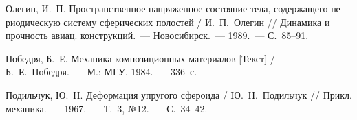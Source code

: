\begin{russian}
\begin{biblist}{99}







Олегин, И.~П. 
Пространственное напряженное состояние тела, содержащего периодическую систему сферических полостей 
/ И.~П.~Олегин 
// Динамика и прочность авиац. конструкций.~--- Новосибирск.~--- 1989.~--- С.~85--91.

Победря, Б.~Е. 
Механика композиционных материалов [Текст] 
/ Б.~Е.~Победря.~--- М.: МГУ, 1984.~--- 336~с.

Подильчук, Ю.~Н. 
Деформация упругого сфероида 
/ Ю.~Н.~Подильчук 
// Прикл. механика.~--- 1967.~--- Т.~3, №12.~--- С.~34--42.


\end{biblist}
\end{russian}
